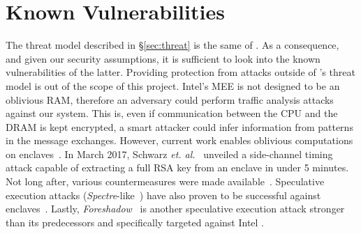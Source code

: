 \section{Known Vulnerabilities} \label{sec:vulnerabilities}

The threat model described in \S\ref{sec:threat} is the same of \sgx.
As a consequence, and given our security assumptions, it is sufficient to look into the known vulnerabilities of the latter.
Providing protection from attacks outside of \sgx's threat model is out of the scope of this project.
Intel's MEE is not designed to be an oblivious RAM, therefore an adversary could perform traffic analysis attacks~\cite{Gueron16} against our system.
This is, even if communication between the CPU and the DRAM is kept encrypted, a smart attacker could infer information from patterns in the message exchanges.
However, current work enables oblivious computations on enclaves~\cite{Zheng2017}. 
In March 2017, Schwarz \textit{et. al.}~\cite{Schwarz2017} unveiled a side-channel timing attack capable of extracting a full RSA key from an enclave in under 5 minutes.  
Not long after, various countermeasures were made available~\cite{Brasser2017,Gruss2017}.
Speculative execution attacks (\textit{Spectre}-like~\cite{Kocher2018}) have also proven to be successful against enclaves~\cite{sgx-spectre}. 
Lastly, \textit{Foreshadow}~\cite{VanBulck2018} is another speculative execution attack stronger than its predecessors and specifically targeted against Intel \sgx.
